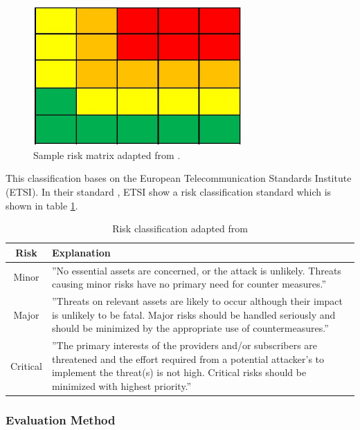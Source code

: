 \begin{figure}[ht!]
  \centering
  \includegraphics[width=8cm]{pictures/sample_matrix.jpg}
  \caption{Sample risk matrix adapted from \cite{Ivanenko2020IMPLEMENTATIONOR}.}
  \label{fig:sample_matrix}
\end{figure}

This classification bases on the European Telecommunication Standards Institute (ETSI). In their standard \cite{applications_2022}, ETSI show a risk classification standard which is shown in table \ref{tab:risk_classify}.

\begin{table}[h]
\centering
  \begin{tabular}{|c|p{10cm}|}
  \hline
  \rowcolor{lightgray} Risk & Explanation \\
  \hline
  Minor & ''No essential assets are concerned, or the attack is unlikely. Threats causing minor risks have no
primary need for counter measures.''  \\
  \hline
  Major & ''Threats on relevant assets are likely to occur although their impact is unlikely to be fatal. Major
risks should be handled seriously and should be minimized by the appropriate use of
countermeasures.'' \\
  \hline
  Critical & ''The primary interests of the providers and/or subscribers are threatened and the effort required
from a potential attacker's to implement the threat(s) is not high. Critical risks should be
minimized with highest priority.'' \\
  \hline
  \end{tabular}
\caption{Risk classification adapted from \cite{applications_2022}}
\label{tab:risk_classify}
\end{table}

\subsubsection*{Evaluation Method}

